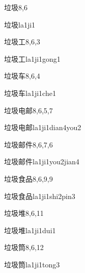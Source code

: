 \begin{entry}{垃圾}{8,6}
  \begin{phonetics}{垃圾}{la1ji1}
  \end{phonetics}
\end{entry}

\begin{entry}{垃圾工}{8,6,3}
  \begin{phonetics}{垃圾工}{la1ji1gong1}
  \end{phonetics}
\end{entry}

\begin{entry}{垃圾车}{8,6,4}
  \begin{phonetics}{垃圾车}{la1ji1che1}
  \end{phonetics}
\end{entry}

\begin{entry}{垃圾电邮}{8,6,5,7}
  \begin{phonetics}{垃圾电邮}{la1ji1dian4you2}
  \end{phonetics}
\end{entry}

\begin{entry}{垃圾邮件}{8,6,7,6}
  \begin{phonetics}{垃圾邮件}{la1ji1you2jian4}
  \end{phonetics}
\end{entry}

\begin{entry}{垃圾食品}{8,6,9,9}
  \begin{phonetics}{垃圾食品}{la1ji1shi2pin3}
  \end{phonetics}
\end{entry}

\begin{entry}{垃圾堆}{8,6,11}
  \begin{phonetics}{垃圾堆}{la1ji1dui1}
  \end{phonetics}
\end{entry}

\begin{entry}{垃圾筒}{8,6,12}
  \begin{phonetics}{垃圾筒}{la1ji1tong3}
  \end{phonetics}
\end{entry}

